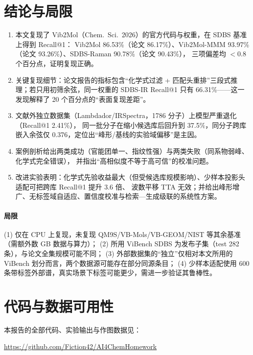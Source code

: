 \documentclass[UTF8,a4paper,11pt]{ctexart}
\begin{document}
\section{结论与局限}
\begin{enumerate}[leftmargin=1.4em,itemsep=2pt]
\item 本文复现了 Vib2Mol（Chem.\ Sci.\ 2026）的官方代码与权重，在 SDBS 基准上得到 Recall@1：
     Vib2Mol 86.53\%（论文 86.17\%）、Vib2Mol-MMM 93.97\%（论文 93.26\%）、SDBS-Raman 90.78\%（论文 90.43\%），
     三项偏差均 $<0.8$ 个百分点，证明复现正确。
\item 关键复现细节：论文报告的指标包含“化学式过滤 + 匹配头重排”三段式推理；若只用初筛余弦，同一权重的
     SDBS-IR Recall@1 只有 66.31\%——这一发现解释了 20 个百分点的“表面复现差距”。
\item 文献外独立数据集（Lambdador/IRSpectra，1786 分子）上模型严重退化（Recall@1 2.41\%），
     同一批分子在缩小候选库后回升到 37.5\%，同分子跨库嵌入余弦仅 0.376，定位出“峰形/基线的实验域偏移”是主因。
\item 案例剖析给出两类成功（官能团单一、指纹性强）与两类失败（同系物弱峰、化学式完全错误），
     并指出“高相似度不等于高可信”的校准问题。
\item 改进实验表明：化学式先验收益最大（但受候选库规模影响）、少样本投影头适配可把跨库 Recall@1 提升 3.6 倍、
     波数平移 TTA 无效；并给出峰形增广、无标签域自适应、置信度校准与检索—生成级联的系统性方案。
\end{enumerate}

\paragraph{局限}
(1) 仅在 CPU 上复现，未复现 QM9S/VB-Mols/VB-GEOM/NIST 等其余基准（需额外数 GB 数据与算力）；
(2) 所用 ViBench SDBS 为发布子集（test 282 条），与论文全集规模可能不同；
(3) 外部数据集的“独立”仅相对本文所用的 ViBench 划分而言，两个数据源可能存在部分同源条目；
(4) 少样本适配使用 600 条带标签外部谱，真实场景下标签可能更少，需进一步验证其鲁棒性。

\section{代码与数据可用性}
本报告的全部代码、实验输出与作图数据见：
\begin{center}
\url{https://github.com/Fiction42/AI4ChemHomework}
\end{center}
\end{document}
